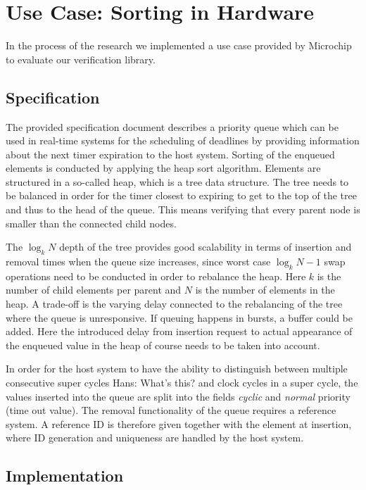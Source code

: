 \documentclass[conference]{IEEEtran}
\newcommand{\hjd}[1]{{\color{pink} Hans: #1}}
\begin{document}
\section{Use Case: Sorting in Hardware}

In the process of the research we implemented a use case provided by Microchip to evaluate our verification library.

\subsection{Specification}

The provided specification document describes a priority queue which can be used in real-time systems for the scheduling of deadlines by providing information about the 
next timer expiration to the host system. Sorting of the enqueued elements is conducted by applying the heap sort algorithm. Elements are structured in a so-called 
heap, which is a tree data structure. The tree needs to be balanced in order for the
timer closest to expiring to get to the top of the tree and thus to the head of the queue. This means verifying that every parent node is smaller than the connected child nodes.


The $\log_k N$ depth of the tree provides good scalability in terms of insertion and removal times when the queue size increases, 
since worst case $\log_k N-1$ swap operations need to be conducted in order to rebalance the heap. Here $k$ is the number of child elements per parent and $N$
is the number of elements in the heap. A trade-off is the varying delay connected to the rebalancing of the tree where the queue is unresponsive. If queuing
happens in bursts, a buffer could be added. Here the introduced delay from insertion request to actual appearance of the enqueued value in the heap of course needs
to be taken into account.

In order for the host system to have the ability to distinguish between multiple consecutive super cycles \hjd{What's this?} and clock cycles in a super cycle, the values inserted 
into the queue are split into the fields \textit{cyclic} and \textit{normal} priority (time out value). The removal functionality of the queue requires a reference system. A reference 
ID is therefore given together with the element at insertion, where ID generation and uniqueness are handled by the host system.

\subsection{Implementation}
\end{document}

